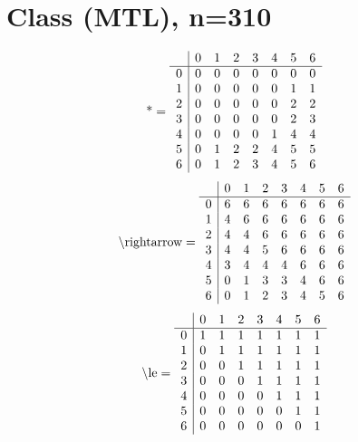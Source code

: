 \documentclass[11pt]{article}
\begin{document}
\section{Class (MTL), n=310}
\[\text{*} = 
\begin{array}{r | r r r r r r r}
 & 0 & 1 & 2 & 3 & 4 & 5 & 6 \\ \hline
0 & 0 & 0 & 0 & 0 & 0 & 0 & 0 \\
1 & 0 & 0 & 0 & 0 & 0 & 1 & 1 \\
2 & 0 & 0 & 0 & 0 & 0 & 2 & 2 \\
3 & 0 & 0 & 0 & 0 & 0 & 2 & 3 \\
4 & 0 & 0 & 0 & 0 & 1 & 4 & 4 \\
5 & 0 & 1 & 2 & 2 & 4 & 5 & 5 \\
6 & 0 & 1 & 2 & 3 & 4 & 5 & 6 \\
\end{array}
\]
\[\text{\textbackslash rightarrow} = 
\begin{array}{r | r r r r r r r}
 & 0 & 1 & 2 & 3 & 4 & 5 & 6 \\ \hline
0 & 6 & 6 & 6 & 6 & 6 & 6 & 6 \\
1 & 4 & 6 & 6 & 6 & 6 & 6 & 6 \\
2 & 4 & 4 & 6 & 6 & 6 & 6 & 6 \\
3 & 4 & 4 & 5 & 6 & 6 & 6 & 6 \\
4 & 3 & 4 & 4 & 4 & 6 & 6 & 6 \\
5 & 0 & 1 & 3 & 3 & 4 & 6 & 6 \\
6 & 0 & 1 & 2 & 3 & 4 & 5 & 6 \\
\end{array}
\]
\[\text{\textbackslash le} = 
\begin{array}{r | r r r r r r r}
 & 0 & 1 & 2 & 3 & 4 & 5 & 6 \\ \hline
0 & 1 & 1 & 1 & 1 & 1 & 1 & 1 \\
1 & 0 & 1 & 1 & 1 & 1 & 1 & 1 \\
2 & 0 & 0 & 1 & 1 & 1 & 1 & 1 \\
3 & 0 & 0 & 0 & 1 & 1 & 1 & 1 \\
4 & 0 & 0 & 0 & 0 & 1 & 1 & 1 \\
5 & 0 & 0 & 0 & 0 & 0 & 1 & 1 \\
6 & 0 & 0 & 0 & 0 & 0 & 0 & 1 \\
\end{array}
\]
\end{document}
